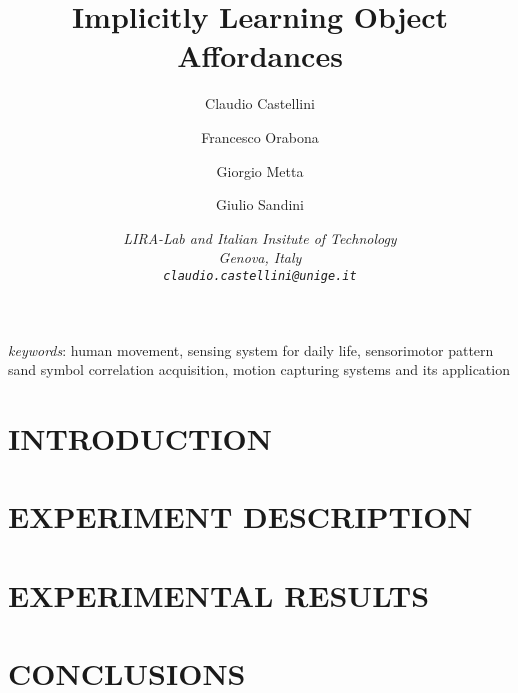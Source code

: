 \documentclass{arsubmit}
\title{Implicitly Learning Object Affordances}
\author{Claudio Castellini \and Francesco Orabona \and Giorgio Metta \and Giulio Sandini}
\date{\small \it{
LIRA-Lab and Italian Insitute of Technology\\
Genova, Italy\\
{\tt claudio.castellini@unige.it}
}}
\begin{document}
\maketitle

\begin{abstract}

\end{abstract}

{\it keywords}: human movement, sensing system for daily life,
sensorimotor pattern sand symbol correlation acquisition, motion
capturing systems and its application

\section{INTRODUCTION}
\label{sec:introduction}


\section{EXPERIMENT DESCRIPTION}
\label{sec:exp_desc}


\section{EXPERIMENTAL RESULTS}
\label{sec:exp_res}


\section{CONCLUSIONS}
\label{sec:Conclusions}


{\small


}
\end{document}
